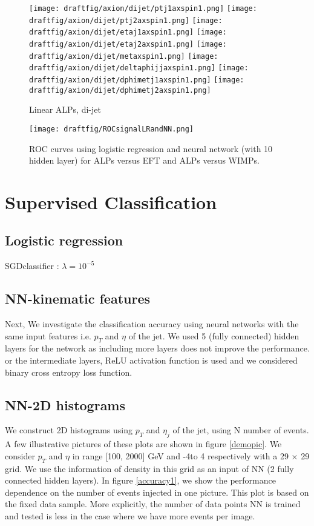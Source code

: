 \documentclass[aps,onecolumn,showpacs,superscriptaddress,groupedaddress,nofootinbib,preprint]{revtex4-1}
\begin{document}
\begin{figure}
\centering
\texttt{[image: draftfig/axion/dijet/ptj1axspin1.png]}
\texttt{[image: draftfig/axion/dijet/ptj2axspin1.png]}
\texttt{[image: draftfig/axion/dijet/etaj1axspin1.png]}
\texttt{[image: draftfig/axion/dijet/etaj2axspin1.png]}
\texttt{[image: draftfig/axion/dijet/metaxspin1.png]}
\texttt{[image: draftfig/axion/dijet/deltaphijjaxspin1.png]}
\texttt{[image: draftfig/axion/dijet/dphimetj1axspin1.png]}
\texttt{[image: draftfig/axion/dijet/dphimetj2axspin1.png]}
\caption{Linear ALPs, di-jet}
\end{figure}





\begin{figure}
\centering
\texttt{[image: draftfig/ROCsignalLRandNN.png]}
\caption{ROC curves using logistic regression and neural network (with 10 hidden layer) for ALPs versus EFT and ALPs versus WIMPs.}
\end{figure}

\section{Supervised Classification}

\subsection{Logistic regression} 
SGDclassifier : $\lambda= 10^{-5}$
\subsection{NN-kinematic features}
Next, We investigate the classification accuracy using  neural networks with the same input 
features i.e. $p_T$ and $\eta$ of the jet. We used 5 (fully connected) hidden layers for the  network as including more layers does not improve the performance. or the intermediate layers, ReLU activation function is used and we considered binary cross entropy loss function.
\subsection{NN-2D histograms}
We construct 2D histograms using $p_T$ and $\eta_j$ of the jet, using N number of events. A few illustrative pictures of these plots are 
shown in figure \ref{demopic}. We consider $p_T$ and $\eta$ in range [100, 2000] GeV and -4to 4 respectively with a 29 $\times$ 29 grid. We use the information of density in this grid as an input of 
NN (2 fully connected hidden layers). In figure \ref{accuracy1}, we show the performance dependence on the number of events injected in one picture. This plot is 
based on the fixed data sample. More explicitly, the number of data points NN is trained and tested is less in the case where we have more events per image.
\end{document}
